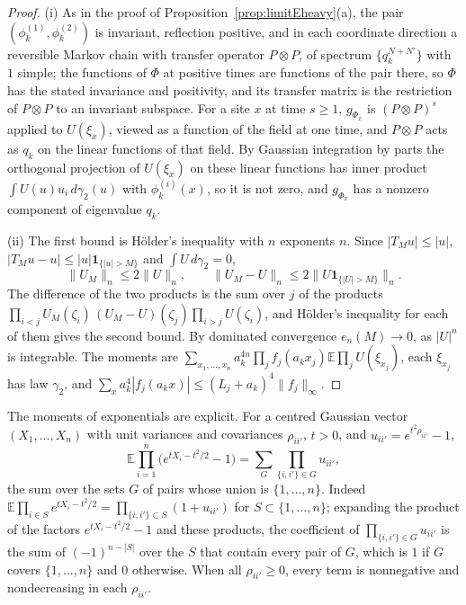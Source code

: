 \documentclass[aps,prd,twocolumn,superscriptaddress,nofootinbib,longbibliography,floatfix,amsmath,amssymb,10pt]{revtex4-2}
\theoremstyle{definition}
\theoremstyle{remark}
\newcommand{\E}{\mathbb{E}}
\begin{document}
\begin{proof}
(i) As in the proof of Proposition~\ref{prop:limitEheavy}(a), the pair
$(\phi^{(1)}_k,\phi^{(2)}_k)$ is invariant, reflection positive, and in
each coordinate direction a reversible Markov chain with transfer operator
$P\otimes P$, of spectrum $\{q_k^{N+N'}\}$ with $1$ simple; the functions of
$\Phi$ at positive times are functions of the pair there, so $\Phi$ has the
stated invariance and positivity, and its transfer matrix is the restriction
of $P\otimes P$ to an invariant subspace. For a site $x$ at time $s\ge1$,
$g_{\Phi_x}$ is $(P\otimes P)^s$ applied to $U(\xi_x)$, viewed as a function
of the field at one time, and $P\otimes P$ acts as $q_k$ on the linear
functions of that field. By Gaussian integration by parts the orthogonal
projection of $U(\xi_x)$ on these linear functions has inner product
$\int U(u)u_i\,d\gamma_2(u)$ with $\phi^{(i)}_k(x)$, so it is not zero, and
$g_{\Phi_x}$ has a nonzero component of eigenvalue $q_k$.

(ii) The first bound is H\"older's inequality with $n$ exponents $n$. Since
$|T_Mu|\le|u|$, $|T_Mu-u|\le|u|\mathbf 1_{\{|u|>M\}}$ and $\int
U\,d\gamma_2=0$,
\[
\|U_M\|_n\le2\|U\|_n,\qquad\|U_M-U\|_n\le2\|U\mathbf 1_{\{|U|>M\}}\|_n .
\]
The difference of the two products is the sum over $j$ of the products
$\prod_{i<j}U_M(\zeta_i)\,(U_M-U)(\zeta_j)\prod_{i>j}U(\zeta_i)$, and
H\"older's inequality for each of them gives the second bound. By dominated
convergence $e_n(M)\to0$, as $|U|^n$ is integrable. The moments
are $\sum_{x_1,\dots,x_n}a_k^{4n}\prod_jf_j(a_kx_j)\E\prod_jU(\xi_{x_j})$,
each $\xi_{x_j}$ has law $\gamma_2$, and $\sum_xa_k^4|f_j(a_kx)|\le(L_j+
a_k)^4\|f_j\|_\infty$.
\end{proof}

The moments of exponentials are explicit. For a centred Gaussian vector
$(X_1,\dots,X_n)$ with unit variances and covariances $\rho_{ii'}$, $t>0$, and
$u_{ii'}=e^{t^2\rho_{ii'}}-1$,
\begin{equation}\label{eq:limitEcover}
\E\prod_{i=1}^n\bigl(e^{tX_i-t^2/2}-1\bigr)=\sum_G\prod_{\{i,i'\}\in G}
u_{ii'} ,
\end{equation}
the sum over the sets $G$ of pairs whose union is $\{1,\dots,n\}$. Indeed
$\E\prod_{i\in S}e^{tX_i-t^2/2}=\prod_{\{i,i'\}\subset S}(1+u_{ii'})$ for
$S\subset\{1,\dots,n\}$; expanding the product of the factors
$e^{tX_i-t^2/2}-1$ and these products, the coefficient of
$\prod_{\{i,i'\}\in G}u_{ii'}$ is the sum of $(-1)^{n-|S|}$ over the $S$
that contain every pair of $G$, which is $1$ if $G$ covers $\{1,\dots,n\}$
and $0$ otherwise. When all $\rho_{ii'}\ge0$, every term is nonnegative and
nondecreasing in each $\rho_{ii'}$.
\end{document}
